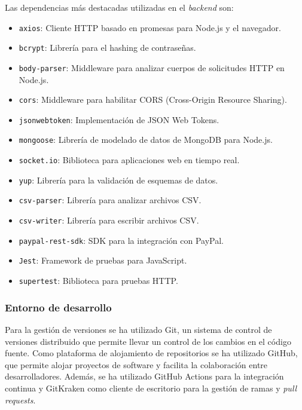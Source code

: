 Las dependencias más destacadas utilizadas en el \textit{backend} son:
\begin{itemize}
    \item \texttt{axios}: Cliente HTTP basado en promesas para Node.js y el navegador.
    \item \texttt{bcrypt}: Librería para el hashing de contraseñas.
    \item \texttt{body-parser}: Middleware para analizar cuerpos de solicitudes HTTP en Node.js.
    \item \texttt{cors}: Middleware para habilitar CORS (Cross-Origin Resource Sharing).
    \item \texttt{jsonwebtoken}: Implementación de JSON Web Tokens.
    \item \texttt{mongoose}: Librería de modelado de datos de MongoDB para Node.js.
    \item \texttt{socket.io}: Biblioteca para aplicaciones web en tiempo real.
    \item \texttt{yup}: Librería para la validación de esquemas de datos.
    \item \texttt{csv-parser}: Librería para analizar archivos CSV.
    \item \texttt{csv-writer}: Librería para escribir archivos CSV.
    \item \texttt{paypal-rest-sdk}: SDK para la integración con PayPal.
    \item \texttt{Jest}: Framework de pruebas para JavaScript.
    \item \texttt{supertest}: Biblioteca para pruebas HTTP.
\end{itemize}



\subsubsection{Entorno de desarrollo}
Para la gestión de versiones se ha utilizado Git, un sistema de control de versiones distribuido que permite llevar un control de los cambios en el código fuente.
Como plataforma de alojamiento de repositorios se ha utilizado GitHub, que permite alojar proyectos de software y facilita la colaboración entre desarrolladores.
Además, se ha utilizado GitHub Actions para la integración continua y GitKraken como cliente de escritorio para la gestión de ramas y \textit{pull requests}.


